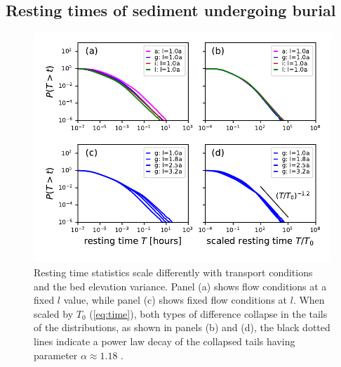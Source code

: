 \subsection{Resting times of sediment undergoing burial}
\label{sec:elertcdf}

\begin{figure}[!htbp]
	\includegraphics[width=\linewidth,keepaspectratio]{./figures/ch3/rtcdf.pdf}
	\caption{Resting time statistics scale differently with transport conditions and the bed elevation variance. Panel (a) shows \DIFdelbeginFL {}\DIFdelendFL \DIFaddbeginFL {}\DIFaddendFL flow conditions at a fixed $l$ value, while panel (c) shows fixed flow conditions at \DIFdelbeginFL {}\DIFdelendFL \DIFaddbeginFL {}\DIFaddendFL $l$. When scaled by $T_0$ (\DIFaddbeginFL {}\DIFaddendFL \ref{eq:time}), both types of difference collapse in the tails of the distributions, as shown in panels (b) and (d)\DIFdelbeginFL {}\DIFdelendFL , \DIFaddbeginFL {}\DIFaddendFL the black dotted lines indicate a power law decay of the collapsed tails having parameter $\alpha\approx1.18$ .}
	\label{fig:cdfs}
\end{figure}

